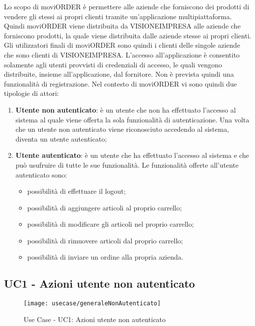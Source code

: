 Lo scopo di moviORDER è permettere alle aziende che forniscono dei prodotti di vendere gli stessi ai propri clienti tramite un'applicazione multipiattaforma. Quindi moviORDER viene distribuita da VISIONEIMPRESA alle aziende che forniscono prodotti, la quale viene distribuita dalle aziende stesse ai propri clienti. Gli utilizzatori finali di moviORDER sono quindi i clienti delle singole aziende che sono clienti di VISIONEIMPRESA.
L'accesso all'applicazione è consentito solamente agli utenti provvisti di credenziali di accesso, le quali vengono distribuite, insieme all'applicazione, dal fornitore. Non è prevista quindi una funzionalità di registrazione. Nel contesto di moviORDER vi sono quindi due tipologie di attori:
\begin{enumerate}
	\item \textbf{Utente non autenticato}: è un utente che non ha effettuato l'accesso al sistema al quale viene offerta la sola funzionalità di autenticazione. Una volta che un utente non autenticato viene riconosciuto accedendo al sistema, diventa un utente autenticato;
	\item \textbf{Utente autenticato}: è un utente che ha effettuato l'accesso al sistema e che può usufruire di tutte le sue funzionalità. Le funzionalità offerte all'utente autenticato sono:
	\begin{itemize}
		\item possibilità di effettuare il logout;
		\item possibilità di aggiungere articoli al proprio carrello;
		\item possibilità di modificare gli articoli nel proprio carrello;
		\item possibilità di rimuovere articoli dal proprio carrello;
		\item possibilità di inviare un ordine alla propria azienda.
	\end{itemize}
\end{enumerate}

\subsection{UC1 - Azioni utente non autenticato}

\begin{figure}[!h] 
    \centering 
    \texttt{[image: usecase/generaleNonAutenticato]} 
    \caption{Use Case - UC1: Azioni utente non autenticato}
\end{figure}

